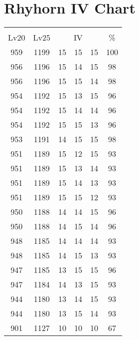 \documentclass{article}%
\begin{document}
%
\normalsize%
\section{Rhyhorn IV Chart}%
\label{sec:Rhyhorn IV Chart}%
\renewcommand{\arraystretch}{1.5}%
\begin{tabular}{|c|c|c|c|c|c|}%
\hline%
\multicolumn{6}{|c|}{\textcolor{white}{ 
\linebreak{Rhyhorn}
}%
\cellcolor{black}}\\%
\multicolumn{1}{|c}{Lv20}&\multicolumn{1}{c|}{Lv25}&\multicolumn{3}{c|}{IV}&\multicolumn{1}{|c|}{\%}\\%
\hline%
\rowcolor{color100}%
959&1199&15&15&15&100\\%
\hline%
\rowcolor{color98}%
956&1196&15&14&15&98\\%
\hline%
\rowcolor{color98}%
956&1196&15&15&14&98\\%
\hline%
\rowcolor{color96}%
954&1192&15&13&15&96\\%
\hline%
\rowcolor{color96}%
954&1192&15&14&14&96\\%
\hline%
\rowcolor{color96}%
954&1192&15&15&13&96\\%
\hline%
\rowcolor{color98}%
953&1191&14&15&15&98\\%
\hline%
\rowcolor{color93}%
951&1189&15&12&15&93\\%
\hline%
\rowcolor{color93}%
951&1189&15&13&14&93\\%
\hline%
\rowcolor{color93}%
951&1189&15&14&13&93\\%
\hline%
\rowcolor{color93}%
951&1189&15&15&12&93\\%
\hline%
\rowcolor{color96}%
950&1188&14&14&15&96\\%
\hline%
\rowcolor{color96}%
950&1188&14&15&14&96\\%
\hline%
\rowcolor{color93}%
948&1185&14&14&14&93\\%
\hline%
\rowcolor{color93}%
948&1185&14&15&13&93\\%
\hline%
\rowcolor{color96}%
947&1185&13&15&15&96\\%
\hline%
\rowcolor{color93}%
947&1184&14&13&15&93\\%
\hline%
\rowcolor{color93}%
944&1180&13&14&15&93\\%
\hline%
\rowcolor{color93}%
944&1180&13&15&14&93\\%
\hline%
\rowcolor{color91}%
901&1127&10&10&10&67\\%
\end{tabular}

%
\end{document}
